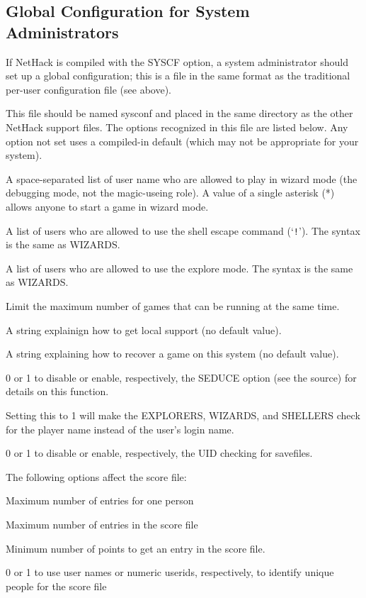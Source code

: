 \subsection*{Global Configuration for System Administrators}

If NetHack is compiled with the SYSCF option, a system administrator
should set up a global configuration; this is a file in the 
same format as the traditional per-user configuration file (see above).

This file should be named sysconf and placed in the same directory as
the other NetHack support files.
The options recognized in this file are listed below. Any option not
set uses a compiled-in default (which may not be appropriate for your
system).

\blist{}
\item[\ib{WIZARDS}]
A space-separated list of user name who are allowed to play in wizard
mode (the debugging mode, not the magic-useing role). A value of a single
asterisk (*) allows anyone to start a game in wizard mode.
\item[\ib{SHELLERS}]
A list of users who are allowed to use the shell escape command (`{\tt !}').
The syntax is the same as WIZARDS.
\item[\ib{EXPLORERS}]
A list of users who are allowed to use the explore mode.
The syntax is the same as WIZARDS.
\item[\ib{MAXPLAYERS}]
Limit the maximum number of games that can be running at the same time.
\item[\ib{SUPPORT}]
A string explainign how to get local support (no default value).
\item[\ib{RECOVER}]
A string explaining how to recover a game on this system (no default value).
\item[\ib{SEDUCE}]
0 or 1 to disable or enable, respectively, the SEDUCE option (see the source)
for details on this function.
\item[\ib{CHECK\verb+_+PLNAME}]
Setting this to 1 will make the EXPLORERS, WIZARDS, and SHELLERS check
for the player name instead of the user's login name.
\item[\ib{CHECK\verb+_+SAVE\verb+_+UID}]
0 or 1 to disable or enable, respectively, the UID checking for savefiles.
\elist

The following options affect the score file:
\blist {}
\item[\ib{PERSMAX}]
Maximum number of entries for one person
\item[\ib{ENTRYMAX}]
Maximum number of entries in the score file
\item[\ib{POINTSMIN}]
Minimum number of points to get an entry in the score file.
\item[\ib{PERS\verb+_+IS\verb+_+UID}]
0 or 1 to use user names or numeric userids, respectively, to identify
unique people for the score file
\elist

